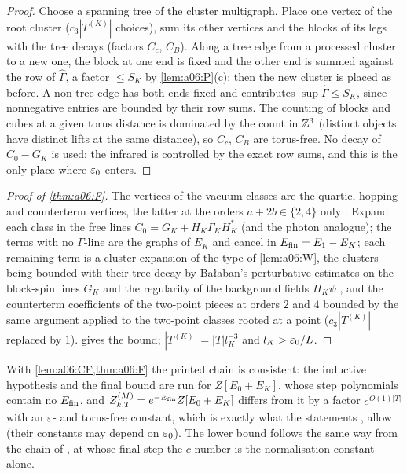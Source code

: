 \begin{proof}
Choose a spanning tree of the cluster multigraph. Place one vertex of the root cluster ($c_3|T^{(K)}|$ choices), sum its other vertices and the blocks of its legs with the tree decays (factors $C_c$, $C_B$). Along a tree edge from a processed cluster to a new one, the block at one end is fixed and the other end is summed against the row of $\hat\Gamma$, a factor $\le S_K$ by \cref{lem:a06:P}(c); then the new cluster is placed as before. A non-tree edge has both ends fixed and contributes $\sup\hat\Gamma\le S_K$, since nonnegative entries are bounded by their row sums. The counting of blocks and cubes at a given torus distance is dominated by the count in $\mathbb Z^3$ (distinct objects have distinct lifts at the same distance), so $C_c$, $C_B$ are torus-free. No decay of $C_0-G_K$ is used: the infrared is controlled by the exact row sums, and this is the only place where $\varepsilon_0$ enters.
\end{proof}

\begin{proof}[Proof of \cref{thm:a06:F}]
The vertices of the vacuum classes are the quartic, hopping and counterterm vertices, the latter at the orders $a+2b\in\{2,4\}$ only \cite[(1.23)]{Ba3}. Expand each class in the free lines $C_0=G_K+H_K\Gamma_KH_K^*$ (and the photon analogue); the terms with no $\Gamma$-line are the graphs of $E_K$ and cancel in $E_{\mathrm{fin}}=E_1-E_K$; each remaining term is a cluster expansion of the type of \cref{lem:a06:W}, the clusters being bounded with their tree decay by Ba{\l}aban's perturbative estimates \cite[Prop.~1]{Ba3} on the block-spin lines $G_K$ and the regularity of the background fields $H_K\psi$ \cite[Prop.~2.1, (2.24)--(2.25)]{Ba1}, and the counterterm coefficients of the two-point pieces at orders $2$ and $4$ bounded by the same argument applied to the two-point classes rooted at a point ($c_3|T^{(K)}|$ replaced by $1$).  gives the bound; $|T^{(K)}|=|T|l_K^{-3}$ and $l_K>\varepsilon_0/L$.
\end{proof}

With \cref{lem:a06:CF,thm:a06:F} the printed chain is consistent: the inductive hypothesis \cite[(2.43)]{Ba2} and the final bound \cite[(2.117)]{Ba2} are run for $Z[E_0+E_K]$, whose step polynomials contain no $E_{\mathrm{fin}}$, and $Z^{(M)}_{k,T}=e^{-E_{\mathrm{fin}}}Z[E_0+E_K]$ differs from it by a factor $e^{O(1)|T|}$ with an $\varepsilon$- and torus-free constant, which is exactly what the statements \cite[(1.14)]{Ba1}, \cite[(1.3)]{Ba2} allow (their constants may depend on $\varepsilon_0$). The lower bound follows the same way from the chain of \cite[Sect.~3]{Ba1}, at whose final step the $c$-number is the normalisation constant alone.



